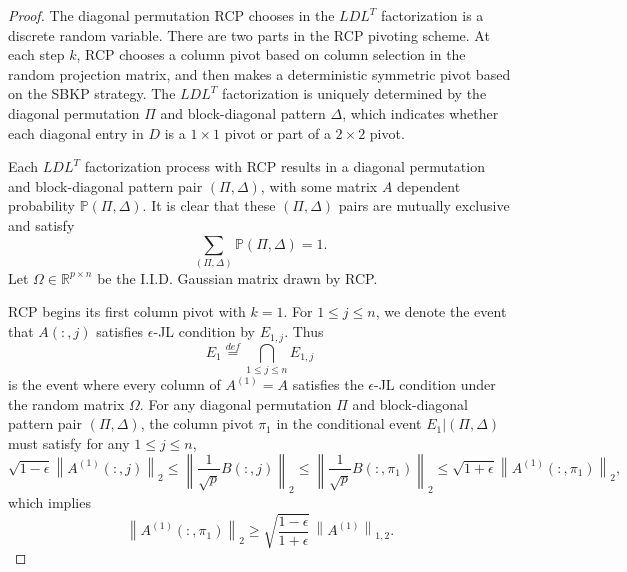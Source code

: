 \documentclass[11pt]{article}
\begin{document}
\begin{proof} The diagonal permutation RCP chooses in the $LDL^T$ factorization is a discrete random variable. There are two parts in the RCP pivoting scheme. At each step $k$, RCP chooses a column pivot based on column selection in the random projection matrix, and then makes a deterministic symmetric pivot based on the SBKP strategy. The $LDL^T$ factorization is uniquely determined by the diagonal permutation $\Pi$ and block-diagonal pattern $\Delta$, which indicates whether each diagonal entry in $D$ is a $1 \times 1$ pivot or part of a $2 \times 2$ pivot. 

Each $LDL^T$ factorization process with RCP results in a diagonal permutation and block-diagonal pattern pair $\left(\Pi, \Delta\right)$, with some matrix $A$ dependent probability $\mathbb{P}\left(\Pi, \Delta\right)$. It is clear that these $\left(\Pi, \Delta\right)$ pairs are mutually exclusive and 
satisfy
\begin{equation}\label{Eqn:prob}
\sum_{\left(\Pi, \Delta\right)} \mathbb{P}\left(\Pi, \Delta\right) = 1. 
\end{equation}
Let $\Omega\in \mathbb{R}^{p \times n}$ be the I.I.D. Gaussian matrix drawn by RCP. 

RCP begins its first column pivot with $k = 1$. For $1 \le j \le n$, we denote the event that $ A( : , j)$ satisfies $\epsilon$-JL condition by $E_{1, j}$. Thus 
\begin{equation}\label{Eqn:E1}
 E_1 \stackrel{def}{=} \bigcap_{1 \le j \le n} E_{1, j}
\end{equation}
is the event where every column of $A^{(1)}=A$ satisfies the  $\epsilon$-JL condition under the random matrix $\Omega$. For any diagonal permutation $\Pi$ and block-diagonal pattern pair $\left(\Pi, \Delta\right) $, the column pivot $\pi_1$ in the conditional event $E_1  \left| \right. \left(\Pi, \Delta\right) $ must satisfy for any $1 \le j \le n$,
\begin{equation}\label{eq:condition between B and A}
\sqrt{1 - \epsilon} \left\| A^{(1)} ( : , j) \right\|_2  \le \left\| \frac{1}{\sqrt{p}} B( : , j) \right\|_2  \le \left\| \frac{1}{\sqrt{p}} B( : , \pi_1) \right\|_2 \le \sqrt{1 + \epsilon} \left\| A^{(1)} ( : , \pi_1) \right\|_2,  
\end{equation}
which implies 
\begin{equation}\label{Eqn:Cond1}
 \left\| A^{(1)}( : , \pi_1) \right\|_2  \ge \sqrt{ \frac{1 - \epsilon}{1 + \epsilon} } \,  \left\| A^{(1)} \right\|_{1,2}.
\end{equation}


\end{proof}
\end{document}
